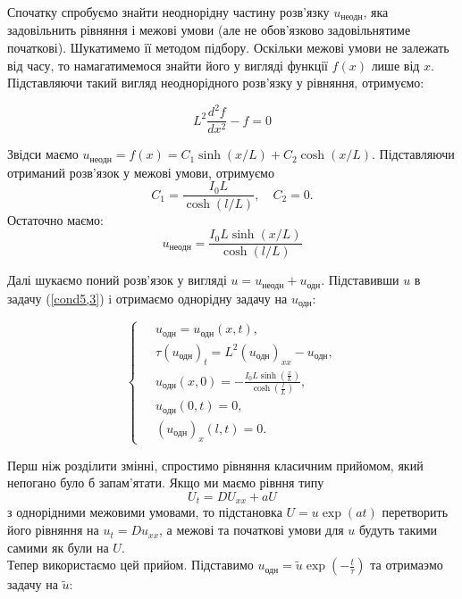 Спочатку спробуємо знайти неоднорідну частину розв'язку $u_{\text{неодн}}$, яка задовільнить рівняння і межові умови (але не обов'язково задовільнятиме початкові). Шукатимемо її методом підбору. Оскільки межові умови не залежать від часу, то намагатимемося знайти його у вигляді функції $f(x)$ лише від $x$. Підставляючи такий вигляд неоднорідного розв'язку у рівняння, отримуємо:

\begin{equation*}
L^2\frac{d^2f}{dx^2} - f = 0
\end{equation*}

Звідси маємо $u_{\text{неодн}} = f(x) = C_1\sinh(x/L) + C_2\cosh(x/L)$. Підставляючи отриманий розв'язок у межові умови, отримуємо \[C_1 = \frac{I_0L}{\cosh(l/L)}, \quad C_2 = 0.\] Остаточно маємо:
\begin{equation}
u_{\text{неодн}}=\frac{I_0L\sinh(x/L)}{\cosh(l/L)}
\end{equation}

Далі шукаємо поний розв'язок у вигляді $u = u_{\text{неодн}} + u_{\text{одн}}$. Підставивши $u$ в задачу (\ref{cond5,3}) i отримаємо однорідну задачу на $u_{\text{одн}}$:

\begin{equation*} 
    \left\{ \begin{aligned}
            \;&u_{\text{одн}} = u_{\text{одн}}(x,t), \\
            &\tau (u_{\text{одн}})_t=L^2(u_{\text{одн}})_{xx}-u_{\text{одн}}, \\
            &u_{\text{одн}}(x,0)=-\frac{I_0L\sinh{(\frac{x}{L})}}{\cosh{(\frac{l}{L})}},\\
            &u_{\text{одн}}(0,t) = 0, \\
            &(u_{\text{одн}})_x(l,t) = 0. 
    \end{aligned} \right.
\end{equation*}

Перш ніж розділити змінні, спростимо рівняння класичним прийомом, який непогано було б запам'ятати. Якщо ми маємо рівння типу 
\begin{equation}
U_t = D U_{xx} + aU    
\end{equation}
з однорідними межовими умовами, то підстановка $U = u\exp(at)$ перетворить його рівняння на $u_t = D u_{xx}$, а межові та початкові умови для $u$ будуть такими самими як були на $U$.\\

Тепер використаємо цей прийом. Підставимо $u_{\text{одн}} = \tilde{u}\exp(-\frac{t}{\tau})$ та отримаэмо задачу на $\tilde{u}$:

